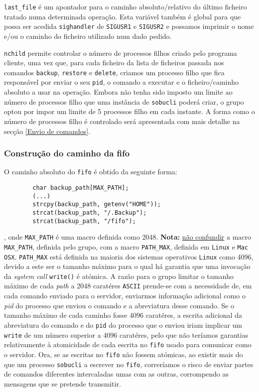 \documentclass[a4paper,12pt,titlepage,portuguese]{article}
\begin{document}
\begin{itemize}
\texttt{last_file} é um apontador para o caminho absoluto/relativo do último ficheiro tratado numa determinada operação. Esta variável também é global para que possa ser acedida \texttt{sighandler} de \texttt{SIGUSR1} e \texttt{SIGUSR2} e possamos imprimir o nome e/ou o caminho do ficheiro utilizado num dado pedido.

\texttt{nchild} permite controlar o número de processos filhos criado pelo programa cliente, uma vez que, para cada ficheiro da lista de ficheiros passada nos comandos \texttt{backup}, \texttt{restore} e \texttt{delete}, criamos um processo filho que fica responsável por enviar o seu \texttt{pid}, o comando a executar e o ficheiro/caminho absoluto a usar na operação. Embora não tenha sido imposto um limite ao número de processos filho que uma instância de \texttt{sobucli} poderá criar, o grupo optou por impor um limite de 5 processos filho em cada instante. A forma como o número de processos filho é controlado será apresentada com mais detalhe na secção \ref{Envio de comandos}.

\subsubsection{Construção do caminho da fifo}

O caminho absoluto do \texttt{fifo} é obtido da seguinte forma:
	\begin{verbatim}
		char backup_path[MAX_PATH];
		(...)
		strcpy(backup_path, getenv("HOME"));
		strcat(backup_path, "/.Backup");
		strcat(backup_path, "/fifo");
	\end{verbatim}
, onde \texttt{MAX_PATH} é uma macro definida como 2048.
\textbf{Nota:} \underline{não confundir} a macro \texttt{MAX_PATH}, definida pelo grupo, com a macro \texttt{PATH_MAX}, definida em \texttt{Linux} e \texttt{Mac OSX}. \texttt{PATH_MAX} está definida na maioria dos sistemas operativos \texttt{Linux} como 4096, devido a este ser o tamanho máximo para o qual há garantia que uma invocação da \emph{system call} \texttt{write()} é atómica. A razão para o grupo limitar o tamanho máximo de cada \emph{path} a 2048 caratéres \texttt{ASCII} prende-se com a necessidade de, em cada comando enviado para o servidor, enviarmos informação adicional como o \emph{pid} do processo que enviou o comando e a abreviatura desse comando. Se o tamanho máximo de cada caminho fosse 4096 caratéres, a escrita adicional da abreviatura do comando e do \texttt{pid} do processo que o enviou iriam implicar um \texttt{write} de um número superior a 4096 caratéres, pelo que não teríamos garantias relativamente à atomicidade de cada escrita no \texttt{fifo} usado para comunicar como o servidor. Ora, se as escritas no \texttt{fifo} não fossem atómicas, ao existir mais do que um processo \texttt{sobucli} a escrever no \texttt{fifo}, correríamos o risco de enviar partes de comandos diferentes intercaladas umas com as outras, corrompendo as mensagens que se pretende transmitir.


\end{itemize}
\end{document}
